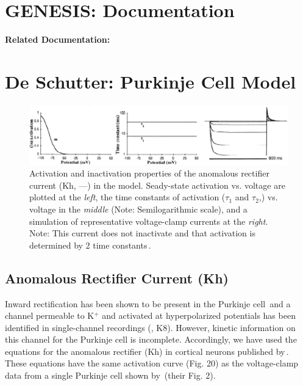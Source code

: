\documentclass[12pt]{article}
\begin{document}
\section*{GENESIS: Documentation}

{\bf Related Documentation:}

\section*{De Schutter: Purkinje Cell Model}

\begin{figure}[h]
\centering
   \includegraphics[scale=0.75]{figures/DS1.2D.eps}
   \caption{Activation and inactivation properties of the anomalous rectifier current (Kh, ---) in the model. Seady-state activation vs. voltage are plotted at the {\em left}, the time constants of activation ($\tau_1$ and $\tau_2$,) vs. voltage in the {\em middle} (Note: Semilogarithmic scale), and a simulation of representative voltage-clamp currents at the {\em right}. Note: This current does not inactivate and that activation is determined by 2 time constants\,\cite{Spain-W-J:1987ij}.}
   \label{fig:DS1.2D}
\end{figure}

\subsection*{Anomalous Rectifier Current (Kh)}

Inward rectification has been shown to be present in the Purkinje cell\,\cite{Crepel:1986cr, Hounsgaard:1988nx} and a channel permeable to K$^+$ and activated at hyperpolarized potentials has been identified in single-channel recordings (\cite{Gruol:1989oq}, K8). However, kinetic information on this channel for the Purkinje cell is incomplete. Accordingly, we have used the equations for the anomalous rectifier (Kh) in cortical neurons published by\,\cite{Spain-W-J:1987ij}. These equations have the same activation curve (Fig. 20) as the voltage-clamp data from a single Purkinje cell shown by\,\cite{Crepel:1986cr} (their Fig. 2).



\end{document}

